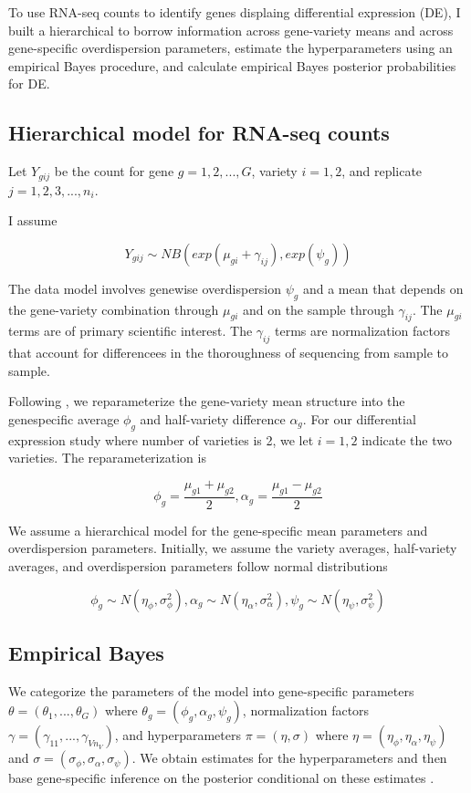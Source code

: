 \documentclass[11pt]{isuthesis}
\begin{document}
To use RNA-seq counts to identify genes displaing differential expression (DE), I built a hierarchical to borrow information across gene-variety means and across gene-specific overdispersion parameters, estimate the hyperparameters using an empirical Bayes procedure, and calculate empirical Bayes posterior probabilities for DE. 

\subsection{Hierarchical model for RNA-seq counts}

Let $Y_{gij}$ be the count for gene $g=1,2,..., G$, variety $i=1,2$, and replicate $j=1,2,3,...,n_i$.

I assume

\begin{equation}
\label{eq:1}
Y_{gij} \sim NB(exp(\mu_{gi}+\gamma_{ij}), exp(\psi_g))
\end{equation}

The data model involves genewise overdispersion $\psi_g$ and a mean that depends on the gene-variety combination through $\mu_{gi}$ and on the sample through $\gamma_{ij}$. The $\mu_{gi}$ terms are of primary scientific interest. The $\gamma_{ij}$ terms are normalization factors that account for differencees in the thoroughness of sequencing from sample to sample. 

Following \cite{ji2014estimation}, we reparameterize the gene-variety mean structure into the genespecific average $\phi_g$ and half-variety difference $\alpha_g$. For our differential expression study where number of varieties is 2, we let $i=1,2$ indicate the two varieties. The reparameterization is

$$\phi_g = \frac{\mu_{g1}+\mu_{g2}}{2}, \alpha_g = \frac{\mu_{g1}-\mu_{g2}}{2}$$

We assume a hierarchical model for the gene-specific mean parameters and overdispersion parameters. Initially, we assume the variety averages, half-variety averages, and overdispersion parameters follow normal distributions

$$\phi_g \sim N(\eta_\phi, \sigma^2_\phi), \alpha_g \sim N(\eta_\alpha , \sigma^2_\alpha), \psi_g \sim N(\eta_\psi, \sigma^2_\psi) $$

\subsection{Empirical Bayes}

We categorize the parameters of the model into gene-specific parameters $\theta = (\theta_1, ..., \theta_G)$ where $\theta_g = (\phi_g, \alpha_g, \psi_g)$, normalization factors $\gamma = (\gamma_{11}, ..., \gamma_{V n_V})$, and hyperparameters $\pi = (\eta, \sigma)$ where $\eta = (\eta_\phi, \eta_\alpha, \eta_\psi)$ and $\sigma = (\sigma_\phi, \sigma_\alpha, \sigma_\psi)$. We obtain estimates for the hyperparameters and then base gene-specific inference on the posterior conditional on these estimates \cite{niemi2015empirical}.
\end{document}
